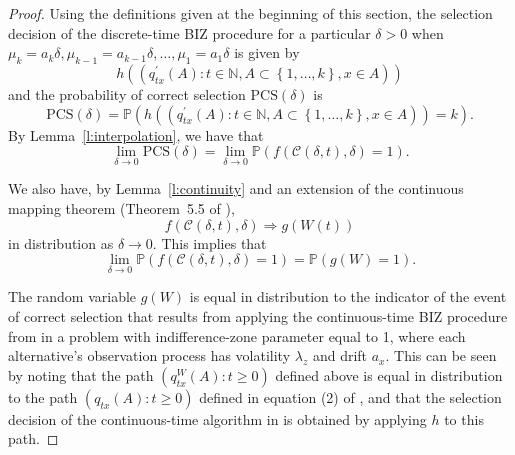 \documentclass{wscpaperproc}
\theoremstyle{wsc}
\begin{document}
\begin{proof}
Using the definitions given at the beginning of this section,
the selection decision of the discrete-time BIZ procedure for a particular $\delta>0$ when $\mu_{k}=a_{k}\delta,\mu_{k-1}=a_{k-1}\delta,\ldots,\mu_{1}=a_{1}\delta$ is given by
\begin{equation*}
h\left(\left(q_{tx}^{'}\left(A\right):t\in\mathbb{N},A\subset\left\{ 1,\ldots,k\right\} ,x\in A\right)\right)
\end{equation*}
and the probability of correct selection $\mbox{PCS}(\delta)$ is
\begin{equation*}
    \mbox{PCS}(\delta) =  \mathbb{P}\left( h\left( \left(q_{tx}^{'}\left(A\right):t\in\mathbb{N},A\subset\left\{ 1,\ldots,k\right\} ,x\in A\right) \right) =k\right).
\end{equation*}
By Lemma~\ref{l:interpolation}, we have that 
\begin{equation}
\lim_{\delta\to0}
\mbox{PCS}(\delta)
 = \lim_{\delta\rightarrow0}
 \mathbb{P}\left(
 f\left(\mathcal{C}\left(\delta,t\right),\delta\right)=1
 \right).
 \label{eq:convergence1}
\end{equation}

We also have, by Lemma~\ref{l:continuity} and an extension of the continuous mapping theorem (Theorem~5.5 of ), 
\begin{equation*}
    f\left(\mathcal{C}\left(\delta,t\right),\delta\right)\Rightarrow g\left(W\left(t\right)\right)
\end{equation*}
in distribution as $\delta\rightarrow0$.
This implies that
\begin{equation}
\lim_{\delta\rightarrow0}\mathbb{P}\left(f\left(\mathcal{C}\left(\delta,t\right),\delta\right)=1\right)
 = \mathbb{P}\left(g\left(W\right)=1\right).
 \label{eq:convergence2}
\end{equation}

The random variable $g(W)$ is equal in distribution to the indicator of the event of correct selection that results from applying the continuous-time BIZ procedure from \cite{Frazier:BIZ} in a problem with indifference-zone parameter equal to 1, where each alternative's observation process has volatility $\lambda_z$ and drift $a_x$.
This can be seen by noting that the path $(q^{W}_{tx}(A) : t\ge0)$ defined above is equal in distribution to the path $(q_{tx}(A) : t\ge0)$ defined in equation (2) of , and that the selection decision of the continuous-time algorithm in  is obtained by applying $h$ to this path.


\end{proof}
\end{document}

